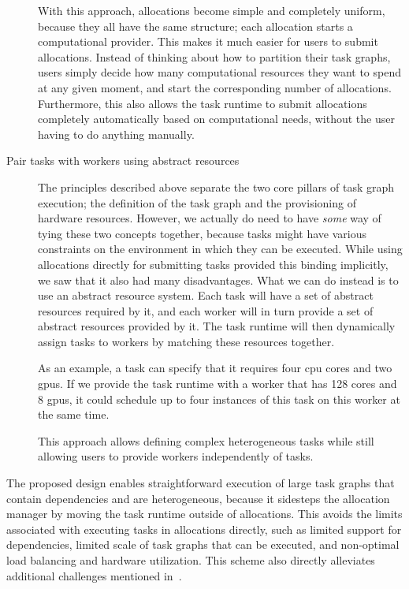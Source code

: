 \begin{description}
		With this approach, allocations become simple and completely uniform, because they all have the
		same structure; each allocation starts a computational provider. This makes it much easier for
		users to submit allocations. Instead of thinking about how to partition their task graphs, users
		simply decide how many computational resources they want to spend at any given moment, and start
		the corresponding number of allocations. Furthermore, this also allows the task runtime to submit
		allocations completely automatically based on computational needs, without the user having to do
		anything manually.
	\item[Pair tasks with workers using abstract resources] The principles described above separate the two core pillars of task graph execution; the
		definition of the task graph and the provisioning of hardware resources. However, we actually do
		need to have \emph{some} way of tying these two concepts together, because tasks might
		have various constraints on the environment in which they can be executed. While using allocations
		directly for submitting tasks provided this binding implicitly, we saw that it also had many
		disadvantages. What we can do instead is to use an abstract resource system. Each task will have a
		set of abstract resources required by it, and each worker will in turn provide a set of abstract
		resources provided by it. The task runtime will then dynamically assign tasks to workers by
		matching these resources together.

		As an example, a task can specify that it requires four \gls{cpu} cores and two
		\glspl{gpu}. If we provide the task runtime with a worker that has 128 cores and 8
		\glspl{gpu}, it could schedule up to four instances of this task on this worker at the
		same time.

		This approach allows defining complex heterogeneous tasks while still allowing users to provide
		workers independently of tasks.
\end{description}

The proposed design enables straightforward execution of large task graphs that contain
dependencies and are heterogeneous, because it sidesteps the allocation manager by moving the task
runtime outside of allocations. This avoids the limits associated with executing tasks in
allocations directly, such as limited support for dependencies, limited scale of task graphs that
can be executed, and non-optimal load balancing and hardware utilization. This scheme also directly
alleviates additional challenges mentioned in~.

